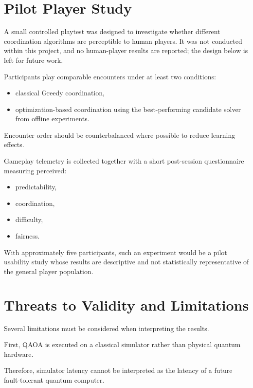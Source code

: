 \documentclass[12pt, a4paper]{article}
\begin{document}
\section*{Pilot Player Study}

A small controlled playtest was designed to investigate whether different coordination algorithms are perceptible to human players. It was not conducted within this project, and no human-player results are reported; the design below is left for future work.

Participants play comparable encounters under at least two conditions:

\begin{itemize}
\item classical Greedy coordination,
\item optimization-based coordination using the best-performing candidate solver from offline experiments.
\end{itemize}

Encounter order should be counterbalanced where possible to reduce learning effects.

Gameplay telemetry is collected together with a short post-session questionnaire measuring perceived:

\begin{itemize}
\item predictability,
\item coordination,
\item difficulty,
\item fairness.
\end{itemize}

With approximately five participants, such an experiment would be a pilot usability study whose results are descriptive and not statistically representative of the general player population.

\section*{Threats to Validity and Limitations}

Several limitations must be considered when interpreting the results.

First, QAOA is executed on a classical simulator rather than physical quantum hardware.

Therefore, simulator latency cannot be interpreted as the latency of a future fault-tolerant quantum computer.
\end{document}
